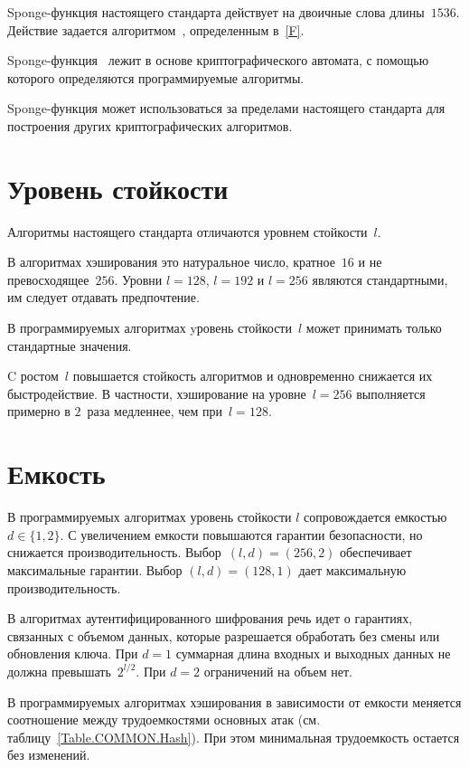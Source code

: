 Sponge-функция настоящего стандарта действует на двоичные слова длины~$1536$.  
Действие задается алгоритмом~, определенным в~\ref{F}. 

Sponge-функция~ лежит в основе криптографического автомата,
с помощью которого определяются программируемые алгоритмы.

Sponge-функция может использоваться за пределами настоящего стандарта для 
построения других криптографических алгоритмов. 

\section{Уровень стойкости}\label{COMMON.Strength}

Алгоритмы настоящего стандарта отличаются уровнем стойкости~$l$. 

В алгоритмах хэширования это натуральное число, кратное~$16$ и 
не превосходящее~$256$. Уровни $l=128$, $l=192$ и $l=256$
являются стандартными, им следует отдавать предпочтение.

В программируемых алгоритмах yровень стойкости~$l$ 
может принимать только стандартные значения. 

C ростом~$l$ повышается стойкость алгоритмов и одновременно снижается 
их быстродействие. В частности, хэширование на уровне~$l=256$ выполняется 
примерно в $2$~раза медленнее, чем при~$l=128$.

\section{Емкость}\label{COMMON.Capacity}

В программируемых алгоритмах уровень стойкости $l$ сопровождается емкостью 
$d\in\{1,2\}$. 
%
%
С увеличением емкости повышаются гарантии безопасности, 
но снижается производительность. 
%
Выбор~$(l,d)=(256,2)$ обеспечивает максимальные гарантии.
Выбор $(l,d)=(128,1)$ дает максимальную производительность. 

В алгоритмах аутентифицированного шифрования речь идет о гарантиях, 
связанных с объемом данных, которые разрешается обработать без смены 
или обновления ключа. 
%
При $d=1$ суммарная длина входных и выходных данных не должна 
превышать~$2^{l/2}$.
%
При $d=2$ ограничений на объем нет. 

В программируемых алгоритмах хэширования в зависимости от емкости 
меняется соотношение между трудоемкостями основных атак 
(см. таблицу~\ref{Table.COMMON.Hash}). При этом минимальная трудоемкость
остается без изменений.

